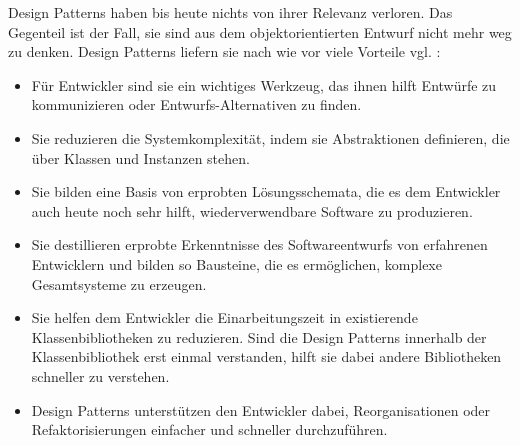 \documentclass[fontsize=11pt,a4paper,final]{scrreprt}[2003/01/01]
\begin{document}
Design Patterns haben bis heute nichts von ihrer Relevanz verloren. Das Gegenteil ist der Fall, sie sind aus dem objektorientierten Entwurf nicht mehr weg zu denken. Design Patterns liefern sie nach wie vor viele Vorteile vgl. \cite{Gamma1993}:
\begin{itemize}
	\item Für Entwickler sind sie ein wichtiges Werkzeug, das ihnen hilft Entwürfe zu kommunizieren oder Entwurfs-Alternativen zu finden.
	\item Sie reduzieren die Systemkomplexität, indem sie Abstraktionen definieren, die über Klassen und Instanzen stehen.
	\item Sie bilden eine Basis von erprobten Lösungsschemata, die es dem Entwickler auch heute noch sehr hilft, wiederverwendbare Software zu produzieren.
	\item Sie destillieren erprobte Erkenntnisse des Softwareentwurfs von erfahrenen Entwicklern und bilden so Bausteine, die es ermöglichen, komplexe Gesamtsysteme zu erzeugen.
	\item Sie helfen dem Entwickler die Einarbeitungszeit in existierende Klassenbibliotheken zu reduzieren. Sind die Design Patterns innerhalb der Klassenbibliothek erst einmal verstanden, hilft sie dabei andere Bibliotheken schneller zu verstehen.
	\item Design Patterns unterstützen den Entwickler dabei, Reorganisationen oder Refaktorisierungen einfacher und schneller durchzuführen.
\end{itemize}
   

\newpage

\end{document}
